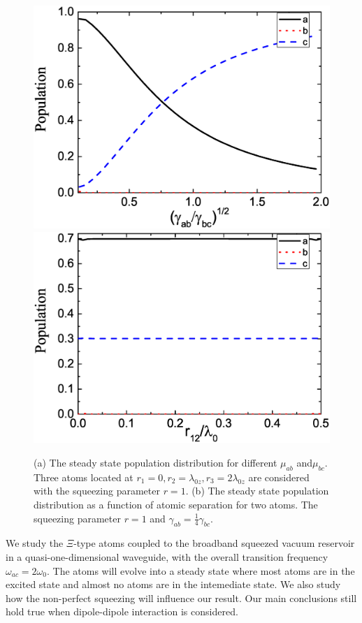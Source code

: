 \documentclass[aps,showpacs,twocolumn,twoside,groupedaddress]{revtex4}
\begin{document}
\begin{figure}
\includegraphics[width=1\columnwidth]{fig3a.eps}
\includegraphics[width=1\columnwidth]{fig3b.eps}
\caption{(a) The steady state population distribution for different $\mu_{ab}$ and$\mu_{bc}$. Three atoms located at $r_1=0, r_2=\lambda_{0z}, r_3=2\lambda_{0z}$ are considered with the squeezing parameter $r=1$. (b) The steady state population distribution as a function of atomic separation for two atoms. The squeezing parameter $r=1$ and $\gamma_{ab}=\frac{1}{4}\gamma_{bc}$.}
\label{2}
\end{figure}


We study the $\Xi$-type atoms coupled to the broadband squeezed vacuum reservoir in a quasi-one-dimensional waveguide, with the overall transition frequency $\omega_{ac}=2\omega_0$. The atoms will evolve into a steady state where most atoms are in the excited state and almost no atoms are in the intemediate state. We also study how the non-perfect squeezing will influence our result. Our main conclusions still hold true when dipole-dipole interaction is considered.
\end{document}
